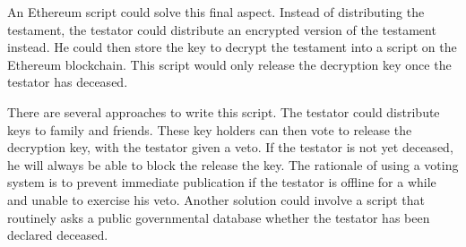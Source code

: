 An Ethereum script could solve this final aspect. Instead of distributing the testament, the testator could distribute an encrypted version of the testament instead. He could then store the key to decrypt the testament into a script on the Ethereum blockchain. This script would only release the decryption key once the testator has deceased.

There are several approaches to write this script. The testator could distribute keys to family and friends. These key holders can then vote to release the decryption key, with the testator given a veto. If the testator is not yet deceased, he will always be able to block the release the key. The rationale of using a voting system is to prevent immediate publication if the testator is offline for a while and unable to exercise his veto. Another solution could involve a script that routinely asks a public governmental database whether the testator has been declared deceased.
